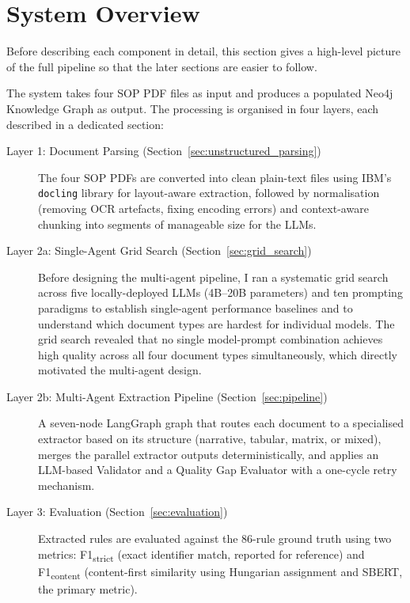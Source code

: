 ﻿\documentclass[11pt]{article}
\begin{document}
\section{System Overview}
\label{sec:overview}

Before describing each component in detail, this section gives a high-level
picture of the full pipeline so that the later sections are easier to follow.

The system takes four SOP PDF files as input and produces a populated Neo4j
Knowledge Graph as output.
The processing is organised in four layers, each described in a dedicated section:

\begin{description}
    \item[Layer 1: Document Parsing (Section~\ref{sec:unstructured_parsing})]
          The four SOP PDFs are converted into clean plain-text files using
          IBM's \texttt{docling} library for layout-aware extraction, followed
          by normalisation (removing OCR artefacts, fixing encoding errors) and
          context-aware chunking into segments of manageable size for the LLMs.

    \item[Layer 2a: Single-Agent Grid Search (Section~\ref{sec:grid_search})]
          Before designing the multi-agent pipeline, I ran a systematic grid search
          across five locally-deployed LLMs (4B--20B parameters) and ten prompting
          paradigms to establish single-agent performance baselines and to understand
          which document types are hardest for individual models.
          The grid search revealed that no single model-prompt combination
          achieves high quality across all four document types simultaneously,
          which directly motivated the multi-agent design.

    \item[Layer 2b: Multi-Agent Extraction Pipeline (Section~\ref{sec:pipeline})]
          A seven-node LangGraph graph that routes each document to a specialised
          extractor based on its structure (narrative, tabular, matrix, or mixed),
          merges the parallel extractor outputs deterministically, and applies an
          LLM-based Validator and a Quality Gap Evaluator with a one-cycle retry
          mechanism.

    \item[Layer 3: Evaluation (Section~\ref{sec:evaluation})]
          Extracted rules are evaluated against the 86-rule ground truth using two
          metrics: F1\textsubscript{strict} (exact identifier match, reported for
          reference) and F1\textsubscript{content} (content-first similarity using
          Hungarian assignment and SBERT, the primary metric).


\end{description}
\end{document}
